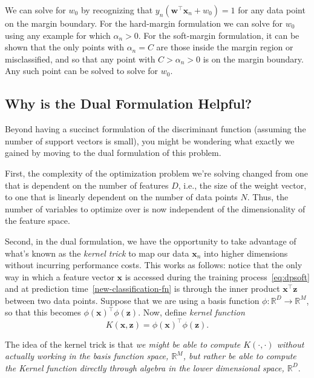We can solve for $w_0$ by recognizing that $y_n({\mathbf w}^\top {\mathbf x}_n+w_0)=1$ for any data point on the margin boundary. For the hard-margin formulation we can solve for $w_0$ using any example for which $\alpha_n>0$. For the soft-margin formulation, it can be shown that the only points with $\alpha_n=C$ are those inside the margin region or misclassified, and so that any point with $C>\alpha_n>0$ is on the margin boundary. Any such point can be solved to solve for $w_0$.


\subsection{Why is the Dual Formulation Helpful?}

Beyond having a succinct formulation of the discriminant function (assuming the number of support vectors is small), you might be wondering what exactly we gained by moving to the dual formulation of this problem.

First, the complexity of the optimization problem we're solving changed from one that is dependent on the number of features $D$, i.e., the size of the weight vector, to one that is linearly dependent on the number of data points $N$. Thus, the number of variables to optimize over is now independent of the dimensionality of the feature space.

Second, in the dual formulation, we have the opportunity to take advantage of what's known as the \textit{kernel trick} to map our data $\textbf{x}_{n}$ into higher dimensions without incurring performance costs. This works as follows: notice that the only way in which a feature vector ${\mathbf x}$ is accessed during the training process~\eqref{eq:dpsoft} and at prediction time~\eqref{new-classification-fn} is through the inner product $\textbf{x}^\top\textbf{z}$ between two data points. Suppose that we are using a basis function $\phi: \mathbb{R}^D\to\mathbb{R}^M$, so that this becomes $\phi(\textbf{x})^\top \phi(\textbf{z})$. Now, define {\em kernel function}
%
\begin{equation} \label{kernel-fn}
	K(\textbf{x}, \textbf{z}) = \phi(\textbf{x})^\top \phi(\textbf{z}).
      \end{equation}

      The idea of the kernel trick is that {\em we might be able to compute $K(\cdot,\cdot)$ without actually working in the basis function space, $\mathbb{R}^M$, but rather be able to compute the Kernel function directly through algebra in the lower dimensional space, $\mathbb{R}^D$}.

